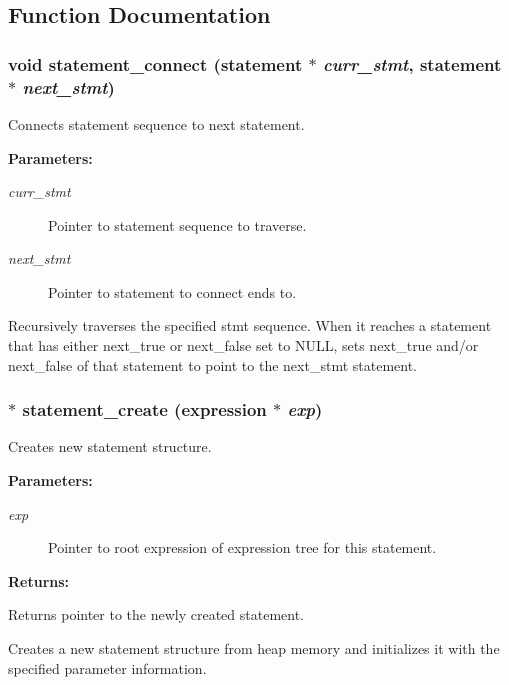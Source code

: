 \subsection{Function Documentation}
\subsubsection{\setlength{\rightskip}{0pt plus 5cm}void statement\_\-connect ({\bf statement} $\ast$ {\em curr\_\-stmt}, {\bf statement} $\ast$ {\em next\_\-stmt})}\label{statement_8c_a7}


Connects statement sequence to next statement.

\begin{Desc}
\item[{\bf Parameters: }]\par
\begin{description}
\item[
{\em curr\_\-stmt}]Pointer to statement sequence to traverse. \item[
{\em next\_\-stmt}]Pointer to statement to connect ends to.

\end{description}
\end{Desc}
Recursively traverses the specified stmt sequence. When it reaches a statement  that has either next\_\-true or next\_\-false set to NULL, sets next\_\-true and/or  next\_\-false of that statement to point to the next\_\-stmt statement. 
\subsubsection{ $\ast$ statement\_\-create ({\bf expression} $\ast$ {\em exp})}\label{statement_8c_a2}


Creates new statement structure.

\begin{Desc}
\item[{\bf Parameters: }]\par
\begin{description}
\item[
{\em exp}]Pointer to root expression of expression tree for this statement.

\end{description}
\end{Desc}
\begin{Desc}
\item[{\bf Returns: }]\par
Returns pointer to the newly created statement.

\end{Desc}
Creates a new statement structure from heap memory and initializes it with the specified parameter information. 
